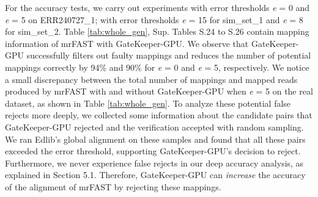 For the accuracy tests, we carry out experiments with error thresholds \textit{e} = 0 and \textit{e} = 5 on ERR240727\_1; with error thresholds \textit{e} = 15 for sim\_set\_1 and \textit{e} = 8 for sim\_set\_2. Table \ref{tab:whole_gen}, Sup. Tables  S.24 to S.26 contain mapping information of mrFAST with GateKeeper-GPU. We observe that GateKeeper-GPU successfully filters out faulty mappings and reduces the number of potential mappings correctly by 94\% and 90\% for \textit{e} = 0 and \textit{e} = 5, respectively. We notice a small discrepancy between the total number of mappings and mapped reads produced by mrFAST with and without GateKeeper-GPU when \textit{e} = 5 on the real dataset, as shown in Table \ref{tab:whole_gen}. To analyze these potential false rejects more deeply, we collected some information about the candidate pairs that GateKeeper-GPU rejected and the verification accepted with random sampling. We ran Edlib's global alignment on these samples and found that all these pairs exceeded the error threshold, supporting GateKeeper-GPU's decision to reject. Furthermore, we never experience false rejects in our deep accuracy analysis, as explained in Section 5.1. Therefore, GateKeeper-GPU can \textit{increase} the accuracy of the alignment of mrFAST by rejecting these mappings.

